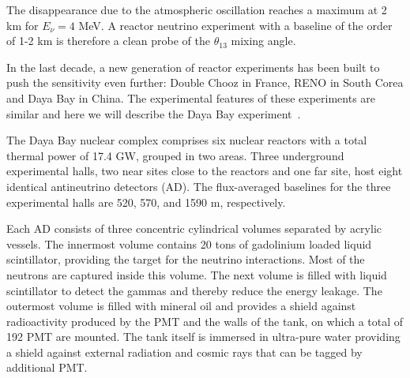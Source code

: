 
The disappearance due to the atmospheric oscillation reaches a maximum at 2 km for $E_\nu=4$ MeV. A reactor neutrino experiment with a baseline of the order of 1-2 km is therefore a clean probe of the $\theta_{13}$ mixing angle.

In the last decade, a new generation of reactor experiments has been built to push the sensitivity even further: Double Chooz in France, RENO in South Corea and Daya Bay in China. The experimental features of these experiments are similar and here we will describe the Daya Bay experiment~\cite{DBdet}.

The Daya Bay nuclear complex comprises six nuclear reactors with a total thermal power of 17.4 GW, grouped in two areas. Three underground experimental halls, two near sites close to the reactors and one far site, host eight identical antineutrino detectors (AD).
The flux-averaged baselines
for the three experimental halls are 520, 570, and 1590 m,
respectively.

Each AD consists of three concentric cylindrical volumes separated by acrylic vessels. The innermost volume contains 20 tons of gadolinium loaded liquid scintillator, providing the target for the neutrino interactions. Most of the neutrons are captured inside this volume. The next volume is filled with liquid scintillator to detect the gammas and thereby reduce the energy leakage. The outermost volume is filled with mineral oil and provides a shield against radioactivity produced by the PMT and the walls of the tank, on which a total of 192 PMT are mounted. The tank itself is immersed in ultra-pure water providing a shield against external radiation and cosmic rays that can be tagged by additional PMT. 

